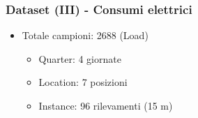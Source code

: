 \documentclass{beamer}
\begin{document}
\begin{frame}
    \frametitle{Dataset (III) - Consumi elettrici}
    \vfill
    
    \begin{itemize}
        \item Totale campioni: 2688 (Load) \begin{itemize}   
            \item Quarter: 4 giornate
            \item Location: 7 posizioni
            \item Instance: 96 rilevamenti (15 m)
        \end{itemize}
    \end{itemize}
    \vfill
    \centering

\end{frame}
\end{document}
